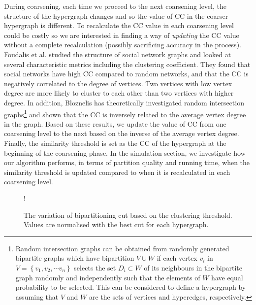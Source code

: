 \documentclass[twocolumn]{svjour3}          \smartqed
\begin{document}
During coarsening, each time we proceed to the next coarsening level, the structure of the hypergraph changes and so the value of CC in the coarser hypergraph is different. To recalculate the CC value in  each coarsening level could be costly so we are interested in finding a way of \textit{updating} the CC value without a complete recalculation (possibly sacrificing accuracy in the process). Foudalis et al. \cite{foudalis2011social} studied the structure of social network graphs and looked at several characteristic metrics including the clustering coefficient. They found that social networks have high CC compared to random networks, and that the CC is negatively correlated to the degree of vertices. Two vertices with low vertex degree are more likely to cluster to each other than two vertices with higher degree. In addition, Bloznelis \cite{bloznelis2013} has theoretically investigated random intersection graphs\footnote{Random intersection graphs can be obtained from randomly generated bipartite graphs which have bipartition $V \cup W$ if each vertex $v_i$ in $V=\left\lbrace v_1, v_2, \cdots v_n \right\rbrace$ selects the set $D_i \subset W$ of its neighbours in the bipartite graph randomly and independently such that the elements of $W$ have equal probability to be selected. This can be considered to define a hypergraph by assuming that $V$ and $W$ are the sets of vertices and hyperedges, respectively.} and shown that the CC is inversely related to the average vertex degree in the graph. Based on these results, we update the value of CC from one coarsening level to the next based on the inverse of the average vertex degree. Finally, the similarity threshold is set as the CC of the hypergraph at the beginning of the coarsening phase. In the simulation section, we investigate how our algorithm performs, in terms of partition quality and running time, when the similarity threshold is updated compared to when it is recalculated in each coarsening level.

\begin{figure}[t]
	\captionsetup{font=small,labelfont=bf}
	\centering
	\resizebox {0.45\textwidth} {!} {
	}
\caption{The variation of bipartitioning cut based on the clustering threshold. Values are normalised with the best cut for each hypergraph.}\label{fig:clus_thre_var}
\end{figure}
\end{document}
